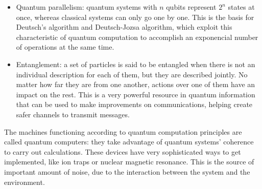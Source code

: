 \documentclass[11pt,a4paper,twoside,pdf]{article}
\numberwithin{equation}{section}
\begin{document}
\begin{center}
\begin{minipage}{0.8\linewidth}
\begin{itemize}
	\item Quantum parallelism: quantum systems with $n$ qubits represent $2^n$ states at once, whereas classical systems can only go one by one. This is the basis for Deutsch’s algorithm and Deutsch-Jozsa algorithm, which exploit this characteristic of quantum computation to accomplish an exponencial number of operations at the same time.
	\item Entanglement: a set of particles is said to be entangled when there is not an individual description for each of them, but they are described jointly. No matter how far they are from one another, actions over one of them have an impact on the rest. This is a very powerful resource in quantum information that can be used  to make improvements on communications, helping create safer channels to transmit messages.
\end{itemize}

The machines functioning according to quantum computation principles are called quantum computers: they take advantage of quantum systems’ coherence to carry out calculations. These devices have very sophisticated ways to get implemented, like ion traps or nuclear magnetic resonance. This is the source of important amount of noise, due to the interaction between the system and the environment.

\end{minipage}

\vfill

\end{center}

\newpage
\end{document}
